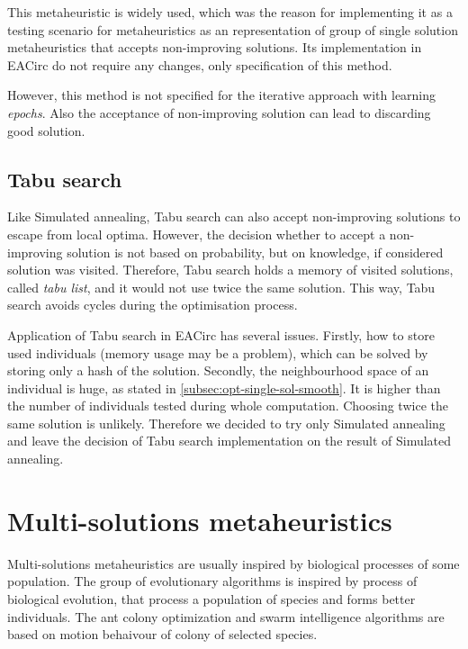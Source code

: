 \documentclass[
  print, %
  Table,   %
  nolof,     %
  nolot,     %
  11pt, %
  oneside  %
]{fithesis3}
\begin{document}
This metaheuristic is widely used, which was the reason for implementing it as a testing scenario for metaheuristics as an representation of group of single solution metaheuristics that accepts non-improving solutions. Its implementation in EACirc do not require any changes, only specification of this method.

However, this method is not specified for the iterative approach with learning \textit{epochs}. Also the acceptance of non-improving solution can lead to discarding good solution.

\subsection{Tabu search}
\label{subsec:opt-single-sol-tabu}

Like Simulated annealing, Tabu search can also accept non-improving solutions to escape from local optima. However, the decision whether to accept a non-improving solution is not based on probability, but on knowledge, if considered solution was visited. Therefore, Tabu search holds a memory of visited solutions, called \textit{tabu list}, and it would not use twice the same solution. This way, Tabu search avoids cycles during the optimisation process.

Application of Tabu search in EACirc has several issues. Firstly, how to store used individuals (memory usage may be a problem), which can be solved by storing only a hash of the solution. Secondly, the neighbourhood space of an individual is huge, as stated in \cref{subsec:opt-single-sol-smooth}. It is higher than the number of individuals tested during whole computation. Choosing twice the same solution is unlikely. Therefore we decided to try only Simulated annealing and leave the decision of Tabu search implementation on the result of Simulated annealing.

\section{Multi-solutions metaheuristics}
\label{sec:opt-multi-sol}

Multi-solutions metaheuristics are usually inspired by biological processes of some population. The group of evolutionary algorithms is inspired by process of biological evolution, that process a population of species and forms better individuals. The ant colony optimization and swarm intelligence algorithms are based on motion behaivour of colony of selected species.
\end{document}
